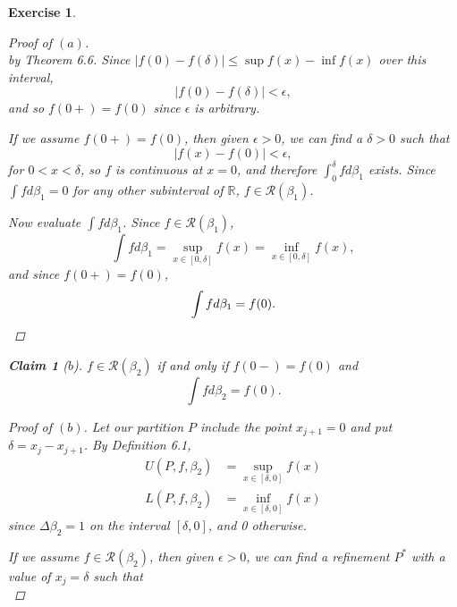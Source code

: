 \documentclass[10pt,letterpaper]{amsart}
\newtheorem{exercise}{Exercise}[section]
\newtheorem*{claim}{Claim}
\theoremstyle{definition}
\theoremstyle{remark}
\numberwithin{equation}{exercise}
\begin{document}
\begin{multicols}{2}
\begin{exercise}
\begin{proof}[Proof of $(a)$]
\begin{equation*}
      \end{equation*}
      by Theorem 6.6. Since $|f(0) - f(\delta)| \le \sup f(x) - \inf f(x)$ over this interval,
      \begin{equation*}
        |f(0) - f(\delta)| < \epsilon,
      \end{equation*}
      and so $f(0+) = f(0)$ since $\epsilon$ is arbitrary.
      \par If we assume $f(0+) = f(0)$, then given $\epsilon > 0$, we can find a $\delta > 0$ such that
      \begin{equation*}
        |f(x) - f(0)| < \epsilon,
      \end{equation*}
      for $0 < x < \delta$, so $f$ is continuous at $x = 0$, and therefore $\int_0^\delta f d\beta_1$ exists. Since $\int f d\beta_1 = 0$ for any other subinterval of $\mathbb{R}$, $f \in \mathscr{R}(\beta_1)$.
      \par Now evaluate $\int f d\beta_1$. Since $f \in \mathscr{R}(\beta_1)$,
      \begin{equation*}
        \int f d\beta_1 = \sup_{x \in [0,\delta]} f(x) = \inf_{x \in [0,\delta]} f(x),
      \end{equation*}
      and since $f(0+) = f(0)$,
      \begin{equation*}
        \int f d\beta_1 = f(0).\qedhere
      \end{equation*}
    \end{proof}
    \begin{claim}[$b$]
      $f \in \mathscr{R}(\beta_2)$ if and only if $f(0-) = f(0)$ and
      \begin{equation*}
        \int f d\beta_2 = f(0).
      \end{equation*}
    \end{claim}
    \begin{proof}[Proof of $(b)$]
      Let our partition $P$ include the point $x_{j+1} = 0$ and put $\delta = x_j - x_{j+1}$. By Definition 6.1,
      \begin{align*}
        U(P,f,\beta_2) &= \sup_{x \in [\delta,0]} f(x)\\
        L(P,f,\beta_2) &= \inf_{x \in [\delta,0]} f(x)
      \end{align*}
      since $\Delta\beta_2 = 1$ on the interval $[\delta,0]$, and 0 otherwise.
      \par If we assume $f \in \mathscr{R}(\beta_2)$, then given $\epsilon > 0$, we can find a refinement $P^*$ with a value of $x_j = \delta$ such that
      \begin{equation*}

\end{equation*}
\end{proof}
\end{exercise}
\end{multicols}
\end{document}
